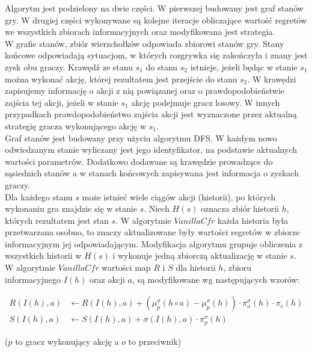 \documentclass[licencjacka]{pracamgr}
\begin{document}
\noindent
Algorytm jest podzielony na dwie części. W pierwszej budowany jest graf stanów gry. W drugiej części
wykonywane są kolejne iteracje obliczające wartość regretów we wszystkich zbiorach informacyjnych oraz
modyfikowana jest strategia. \\

\noindent
W grafie stanów, zbiór wierzchołków odpowiada zbiorowi stanów gry. Stany końcowe odpowiadają
sytuacjom, w których rozgrywka się zakończyła i znany jest zysk obu graczy. Krawędź ze stanu $s_1$ do stanu $s_2$
istnieje, jeżeli będąc w stanie $s_1$ można wykonać akcję, której rezultatem jest przejście do stanu
$s_2$. W krawędzi zapisujemy informację o akcji z nią powiązanej oraz o prawdopodobieństwie zajścia
tej akcji, jeżeli w stanie $s_1$ akcję podejmuje gracz losowy. W innych przypadkach prawdopodobieństwo
zajścia akcji jest wyznaczone przez aktualną strategię gracza wykonującego akcję w $s_1$. \\

\noindent
Graf stanów jest budowany przy użyciu algorytmu DFS. W każdym nowo odwiedzanym stanie
wyliczany jest jego identyfikator, na podstawie aktualnych wartości parametrów. Dodatkowo dodawane
są krawędzie prowadzące do sąsiednich stanów a w stanach końcowych zapisywana jest informacja o
zyskach graczy. \\

\noindent
Dla każdego stanu $s$ może istnieć wiele ciągów akcji (historii), po których wykonaniu gra
znajdzie się w stanie $s$. Niech $H(s)$ oznacza zbiór historii $h$, których rezultatem jest stan $s$.
W algorytmie $VanillaCfr$ każda historia była przetwarzana osobno, to znaczy aktualizowane były wartości
regretów w zbiorze informacyjnym jej odpowiadającym. Modyfikacja algorytmu grupuje obliczenia z
wszystkich historii w $H(s)$ i wykonuje jedną zbiorczą aktualizację w stanie $s$. \\

\noindent
W algorytmie $VanillaCfr$ wartości map $R$ i $S$ dla historii $h$, zbioru informacyjnego $I(h)$ oraz akcji $a$, są modyfikowane
wg następujących wzorów:

\begin{align*}
R(I(h), a) &\leftarrow R(I(h), a) + (\mu_p^{\sigma}(h \circ a) - \mu_p^{\sigma}(h)) \cdot \pi_{o}^{\sigma}(h) \cdot \pi_c(h) \\
S(I(h), a) &\leftarrow S(I(h), a) + \sigma(I(h), a) \cdot \pi_p^{\sigma}(h)
\end{align*}

\noindent
($p$ to gracz wykonujący akcję a $o$ to przeciwnik) \\
\end{document}
